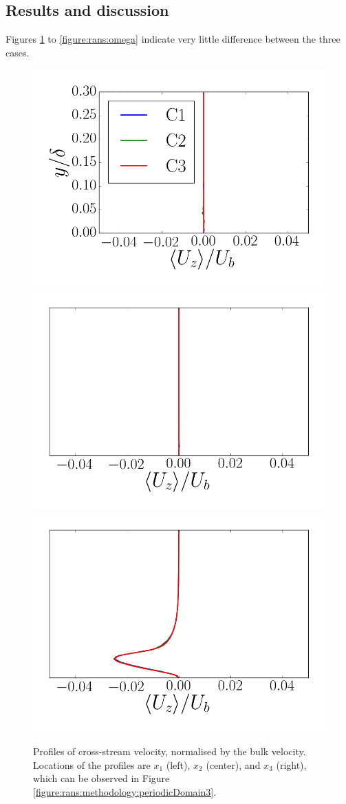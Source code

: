 \documentclass[12pt,oneside,a4paper]{article}
\begin{document}
\subsection{Results and discussion}
Figures \ref{figure:rans:Uz} to \ref{figure:rans:omega} indicate very little difference between the three cases.
\begin{figure}
\centering
\includegraphics[width=0.33\linewidth]{images/CFD_meshIndependence/X1_Ux.png}\hfill \includegraphics[width=0.33\linewidth]{images/CFD_meshIndependence/X2_Ux.png}\hfill \includegraphics[width=0.33\linewidth]{images/CFD_meshIndependence/X3_Ux.png}\hfill
\caption{Profiles of cross-stream velocity, normalised by the bulk velocity. Locations of the profiles are $x_1$ (left), $x_2$ (center), and $x_3$ (right), which can be observed in Figure \ref{figure:rans:methodology:periodicDomain3}.}
\label{figure:rans:Uz}
\end{figure}
\end{document}
